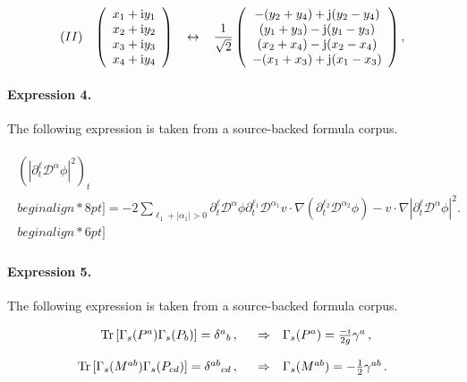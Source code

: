 \documentclass[11pt]{article}
\begin{document}
\begin{align*}(II) \hspace{3mm} \left(\begin{array}{c}x_1+{\rm i}y_1 \\x_2+{\rm i}y_2 \\x_3+{\rm i}y_3 \\x_4+{\rm i}y_4\end{array}\right) \hspace{3mm} \leftrightarrow \hspace{3mm}\frac{1}{\sqrt{2}}\left(\begin{array}{c}-(y_2+y_4) +{\rm j}(y_2-y_4) \\(y_1 + y_3) -{\rm j}(y_1-y_3) \\(x_2 + x_4) -{\rm j}(x_2 - x_4) \\-(x_1 + x_3) +{\rm j}(x_1 - x_3)\end{array}\right),\end{align*}

\paragraph{Expression 4.} The following expression is taken from a source-backed formula corpus.

\begin{align*}\begin{array}{ll}(|\partial_t^{\ell}\mathcal{D}^{\alpha}\phi|^2)_t \\begin{align*}8pt]= -2\sum\limits_{\ell_1+|\alpha_1|>0}\partial_t^{\ell}\mathcal{D}^{\alpha}\phi\partial_t^{\ell_1}\mathcal{D}^{\alpha_1}v\cdot\nabla(\partial_t^{\ell_2}\mathcal{D}^{\alpha_2}\phi)-v\cdot\nabla|\partial_t^{\ell}\mathcal{D}^{\alpha}\phi|^2.\\begin{align*}6pt]\end{array}\end{align*}

\paragraph{Expression 5.} The following expression is taken from a source-backed formula corpus.

\begin{align*}\begin{array}{rcl}{\rm Tr}\, [\Gamma_{s}(P^{a})\Gamma_{s}(P_{b})]= \delta^{a}{}_{b}\, , \,\,\,\, & \Rightarrow & \Gamma_{s}(P^{a}) = {\textstyle\frac{-i}{2g}}\gamma^{a}\, , \\& & \\{\rm Tr}\, [\Gamma_{s}(M^{ab})\Gamma_{s}(P_{cd})]= \delta^{ab}{}_{cd}\, , \,\,\,\, & \Rightarrow & \Gamma_{s}(M^{ab}) = -{\textstyle\frac{1}{2}}\gamma^{ab}\, .\\\end{array}\end{align*}
\end{document}
